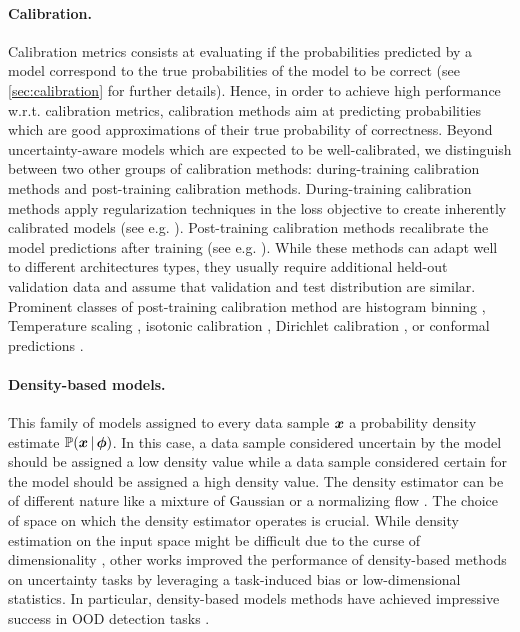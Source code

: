 \paragraph*{Calibration.} Calibration metrics consists at evaluating if the probabilities predicted by a model correspond to the true probabilities of the model to be correct (see \cref{sec:calibration} for further details). Hence, in order to achieve high performance w.r.t. calibration metrics, calibration methods aim at predicting probabilities which are good approximations of their true probability of correctness. Beyond uncertainty-aware models which are expected to be well-calibrated, we distinguish between two other groups of calibration methods: during-training calibration methods and post-training calibration methods. During-training calibration methods apply regularization techniques in the loss objective to create inherently calibrated models (see e.g. \cite{lee2018training,corbieres2019confidence,minderer2021revisiting}). Post-training calibration methods recalibrate the model predictions after training (see e.g. \cite{calibration-network,wenger201calibration}). While these methods can adapt well to different architectures types, they usually require additional held-out validation data and assume that validation and test distribution are similar. Prominent classes of post-training calibration method are histogram binning \cite{zadrozny2001calibrated}, Temperature scaling \cite{calibration-network}, isotonic calibration \cite{zadrozny2002transforming}, Dirichlet calibration \cite{kull2019beyond}, or conformal predictions \cite{conformal-survey,marx2022conformal}.

\paragraph*{Density-based models.} This family of models assigned to every data sample $\bm{x}$ a probability density estimate $\mathbb{P}(\bm{x} \,|\, \bm{\phi})$. In this case, a data sample considered uncertain by the model should be assigned a low density value while a data sample considered certain for the model should be assigned a high density value. The density estimator can be of different nature like a mixture of Gaussian \cite{simple_ood_adv_detection,du2022vos} or a normalizing flow \cite{nf-review,why-nf-fail-ood,postels2020hiddenuncertainty}. The choice of space on which the density estimator operates is crucial. While density estimation on the input space might be difficult due to the curse of dimensionality \citep{anomaly-detection,deep-generative,typicality_OOD_generative}, other works \cite{charpentier2020, why-nf-fail-ood, density-states-ood, contrastive-ood} improved the performance of density-based methods on uncertainty tasks by leveraging a task-induced bias or low-dimensional statistics. In particular, density-based models methods have achieved impressive success in OOD detection tasks \cite{ood-detection-survey}.

